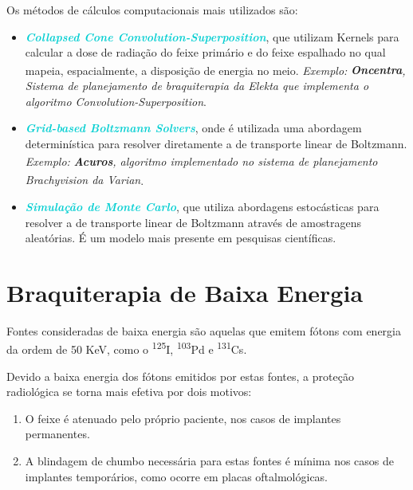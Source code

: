 \documentclass[11pt,a4paper]{article}
\begin{document}
			Os métodos de cálculos computacionais mais utilizados são:

				\begin{itemize}
					\item \textbf{\textit{\textcolor{DarkTurquoise}{Collapsed Cone Convolution-Superposition}}}, que utilizam Kernels para calcular a dose de radiação do feixe primário e do feixe espalhado no qual mapeia, espacialmente, a disposição de energia no meio. \textit{Exemplo:} \textit{\textbf{Oncentra\textsuperscript{\textregistered}}, Sistema de planejamento de braquiterapia da Elekta que implementa o algoritmo Convolution-Superposition}.
					
					\item \textbf{\textit{\textcolor{DarkTurquoise}{Grid-based Boltzmann Solvers}}}, onde é utilizada uma abordagem determinística para resolver diretamente a   de transporte linear de Boltzmann. \textit{Exemplo:} \textit{\textbf{Acuros\textsuperscript{\textregistered}}, algoritmo implementado no sistema de planejamento Brachyvision\textsuperscript{\textregistered} da Varian}.
					
					\item \textbf{\textit{\textcolor{DarkTurquoise}{Simulação de Monte Carlo}}}, que utiliza abordagens estocásticas para resolver a   de transporte linear de Boltzmann através de amostragens aleatórias. É um modelo mais presente em pesquisas científicas.
					
					\end{itemize}
		
	\section{Braquiterapia de Baixa Energia}
		

		Fontes consideradas de baixa energia são aquelas que emitem fótons com energia da ordem de 50 KeV, como o \textsuperscript{125}I, \textsuperscript{103}Pd e \textsuperscript{131}Cs.

		Devido a baixa energia dos fótons emitidos por estas fontes, a proteção radiológica se torna mais efetiva por dois motivos:

			\begin{enumerate}
				\item O feixe é atenuado pelo próprio paciente, nos casos de implantes permanentes.
				\item A blindagem de chumbo necessária para estas fontes é mínima nos casos de implantes temporários, como ocorre em placas oftalmológicas.
			\end{enumerate}
		
\end{document}
